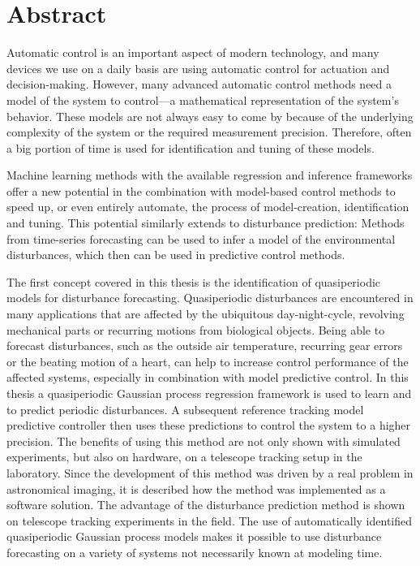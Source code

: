 \begingroup
\let\cleardoublepage\relax

\chapter*{Abstract}

Automatic control is an important aspect of modern technology, and many devices
we use on a daily basis are using automatic control for actuation and
decision-making. However, many advanced automatic control methods need a model
of the system to control---a mathematical representation of the system's
behavior. These models are not always easy to come by because of the underlying
complexity of the system or the required measurement precision. Therefore,
often a big portion of time is used for identification and tuning of these
models.

Machine learning methods with the available regression and inference
frameworks offer a new potential in the combination with model-based control
methods to speed up, or even entirely automate, the process of model-creation,
identification and tuning. This potential similarly extends to disturbance
prediction: Methods from time-series forecasting can be used to infer a
model of the environmental disturbances, which then can be used in predictive
control methods.

The first concept covered in this thesis is the identification of quasiperiodic
models for disturbance forecasting. Quasiperiodic disturbances are encountered
in many applications that are affected by the ubiquitous day-night-cycle,
revolving mechanical parts or recurring motions from biological objects.
Being able to forecast disturbances, such as the outside air temperature,
recurring gear errors or the beating motion of a heart, can help to increase
control performance of the affected systems, especially in combination with
model predictive control. In this thesis a quasiperiodic Gaussian process
regression framework is used to learn and to predict periodic disturbances. A
subsequent reference tracking model predictive controller then uses these
predictions to control the system to a higher precision. The benefits of using
this method are not only shown with simulated experiments, but also on
hardware, on a telescope tracking setup in the laboratory. Since the
development of this method was driven by a real problem in astronomical imaging,
it is described how the method was implemented as a software solution. The
advantage of the disturbance prediction method is shown on telescope tracking
experiments in the field. The use of automatically identified quasiperiodic
Gaussian process models makes it possible to use disturbance forecasting on a
variety of systems not necessarily known at modeling time.

